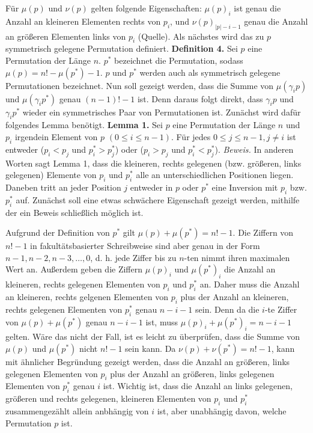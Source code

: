 \documentclass[a4paper, 11pt, ngerman]{article}
\begin{document}
\newline \newline
Für $\mu(p)$ und $\nu(p)$ gelten folgende Eigenschaften: $\mu(p)_i$ ist genau die Anzahl an kleineren Elementen rechts von $p_i$, und $\nu(p)_{|p| - i - 1}$ genau die Anzahl an größeren Elementen links von $p_i$ (Quelle). Als nächstes wird das zu $p$ symmetrisch gelegene Permutation definiert.
\newline \newline
\textbf{Definition 4.} Sei $p$ eine Permutation der Länge $n$. $p^*$ bezeichnet die Permutation, sodass $\mu(p) = n! - \mu(p^*) - 1$. $p$ und $p^*$ werden auch als symmetrisch gelegene Permutationen bezeichnet.
\newline \newline
Nun soll gezeigt werden, dass die Summe von $\mu(\gamma_i p)$ und $\mu(\gamma_i p^*)$ genau $(n - 1)! - 1$ ist. Denn daraus folgt direkt, dass $\gamma_i p$ und $\gamma_i p^*$ wieder ein symmetrisches Paar von Permutationen ist. Zunächst wird dafür folgendes Lemma benötigt.
\newline \newline
\textbf{Lemma 1.} Sei $p$ eine Permutation der Länge $n$ und $p_i$ irgendein Element von $p$ $(0 \le i \le n - 1)$. Für jedes $0 \le j \le n-1, j \ne i$ ist entweder ($p_i < p_j$ und $p^*_i > p^*_j$) oder ($p_i > p_j$ und $p^*_i < p^*_j$).
\newline \newline
\emph{Beweis.} In anderen Worten sagt Lemma 1, dass die kleineren, rechts gelegenen (bzw. größeren, links gelegenen) Elemente von $p_i$ und $p^*_i$ alle an unterschiedlichen Positionen liegen. Daneben tritt an jeder Position $j$ entweder in $p$ oder $p^*$ eine Inversion mit $p_i$ bzw. $p^*_i$ auf. Zunächst soll eine etwas schwächere Eigenschaft gezeigt werden, mithilfe der ein Beweis schließlich möglich ist.

Aufgrund der Definition von $p^*$ gilt $\mu(p) + \mu(p^*) = n! - 1$. Die Ziffern von $n! - 1$ in fakultätsbasierter Schreibweise sind aber genau in der Form $n-1, n-2, n-3, \dots, 0$, d. h. jede Ziffer bis zu $n$-ten nimmt ihren maximalen Wert an. Außerdem geben die Ziffern $\mu(p)_i$ und $\mu(p^*)_{i}$ die Anzahl an kleineren, rechts gelegenen Elementen von $p_i$ und $p^*_i$ an. Daher muss die Anzahl an kleineren, rechts gelgenen Elementen von $p_i$ plus der Anzahl an kleineren, rechts gelegenen Elementen von $p^*_i$ genau $n-i-1$ sein. Denn da die $i$-te Ziffer von $\mu(p) + \mu(p^*)$ genau $n - i - 1$ ist, muss $\mu(p)_i + \mu(p^*)_{i} = n-i-1$ gelten. Wäre das nicht der Fall, ist es leicht zu überprüfen, dass die Summe von $\mu(p)$ und $\mu(p^*)$ nicht $n! - 1$ sein kann. Da $\nu(p) + \nu(p^*) = n! - 1$, kann mit ähnlicher Begründung gezeigt werden, dass die Anzahl an größeren, links gelegenen Elementen von $p_i$ plus der Anzahl an größeren, links gelegenen Elementen von $p^*_i$ genau $i$ ist. Wichtig ist, dass die Anzahl an links gelegenen, größeren und rechts gelegenen, kleineren Elementen von $p_i$ und $p^*_i$ zusammengezählt allein anbhängig von $i$ ist, aber unabhängig davon, welche Permutation $p$ ist.
\end{document}
